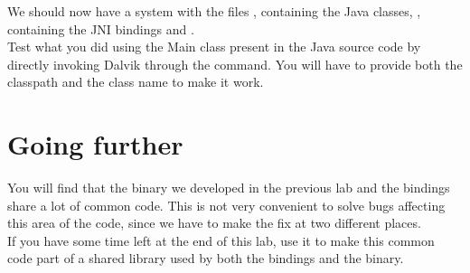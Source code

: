 We should now have a system with the files
, containing the Java
classes, , containing the JNI bindings and
.\\

Test what you did using the Main class present in the Java source code
by directly invoking Dalvik through the  command. You
will have to provide both the classpath and the class name to make it work.\\

\section{Going further}

You will find that the binary we developed in the previous lab and
the bindings share a lot of common code. This is not very convenient
to solve bugs affecting this area of the code, since we have to make
the fix at two different places.\\

If you have some time left at the end of this lab, use it to make this
common code part of a shared library used by both the bindings and the
binary.
